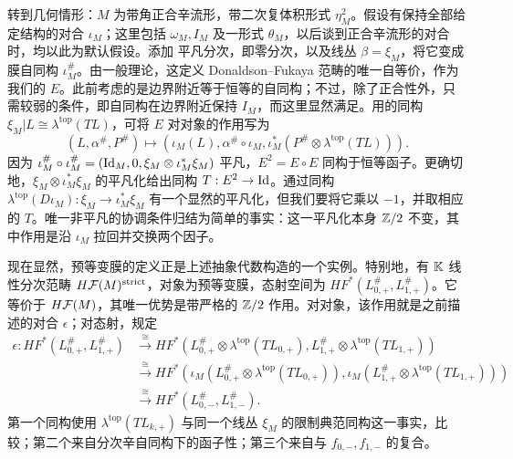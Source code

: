 转到几何情形：$M$ 为带角正合辛流形，带二次复体积形式 $\eta_M^2$。假设有保持全部给定结构的对合 $\iota_M$；这里包括 $\omega_M,\allowbreak I_M$ 及一形式 $\theta_M$，以后谈到正合辛流形的对合时，均以此为默认假设。添加
平凡分次，即零分次，以及线丛 $\beta=\xi_M$，将它变成膜自同构 $\iota_M^\#$。由一般理论，这定义 Donaldson–Fukaya 范畴的唯一自等价，作为我们的 $E$。此前考虑的是边界附近等于恒等的自同构；不过，除了正合性外，只需较弱的条件，即自同构在边界附近保持 $I_M$，而这里显然满足。用的同构 $\xi_M|L\cong\lambda^{\mathrm{top}}(TL)$，可将 $E$ 对对象的作用写为
\begin{equation}\label{eq:14.7}
(L,\alpha^\#,P^\#)\longmapsto
(\iota_M(L),\alpha^\#\circ\iota_M,\iota_M^*(P^\#\otimes\lambda^{\mathrm{top}}(TL))).
\end{equation}
因为 $\iota_M^\#\circ\iota_M^\#=(\operatorname{Id}_M,\allowbreak 0,\allowbreak \xi_M\otimes\iota_M^*\xi_M)$ 平凡，$E^2=E\circ E$ 同构于恒等函子。更确切地，$\xi_M\otimes\iota_M^*\xi_M$ 的平凡化给出同构 $T:E^2\to\operatorname{Id}$。通过同构 $\lambda^{\mathrm{top}}(D\iota_M):\xi_M\to\iota_M^*\xi_M$ 有一个显然的平凡化，但我们要将它乘以 $-1$，并取相应的 $T$。唯一非平凡的协调条件归结为简单的事实：这一平凡化本身 $\mathbb Z/2$ 不变，其中作用是沿 $\iota_M$ 拉回并交换两个因子。

现在显然，预等变膜的定义正是上述抽象代数构造的一个实例。特别地，有 $\mathbb K$ 线性分次范畴 $H\mathcal F(M)^{\mathrm{strict}}$，对象为预等变膜，态射空间为 $HF^*(L_{0,\allowbreak +}^\#,\allowbreak L_{1,\allowbreak +}^\#)$。它等价于 $H\mathcal F(M)$，其唯一优势是带严格的 $\mathbb Z/2$ 作用。对对象，该作用就是之前描述的对合 $\epsilon$；对态射，规定
\begin{equation}\label{eq:14.8}
\begin{aligned}
\epsilon:HF^*(L_{0,+}^\#,L_{1,+}^\#)
&\xrightarrow{\cong}HF^*(L_{0,+}^\#\otimes\lambda^{\mathrm{top}}(TL_{0,+}),L_{1,+}^\#\otimes\lambda^{\mathrm{top}}(TL_{1,+}))\\
&\xrightarrow{\cong}HF^*(\iota_M(L_{0,+}^\#\otimes\lambda^{\mathrm{top}}(TL_{0,+})),
\iota_M(L_{1,+}^\#\otimes\lambda^{\mathrm{top}}(TL_{1,+})))\\
&\xrightarrow{\cong}HF^*(L_{0,-}^\#,L_{1,-}^\#).
\end{aligned}
\end{equation}
第一个同构使用 $\lambda^{\mathrm{top}}(TL_{k,\allowbreak +})$ 与同一个线丛 $\xi_M$ 的限制典范同构这一事实，比较；第二个来自分次辛自同构下的函子性；第三个来自与 $f_{0,\allowbreak -},\allowbreak f_{1,\allowbreak -}$ 的复合。

